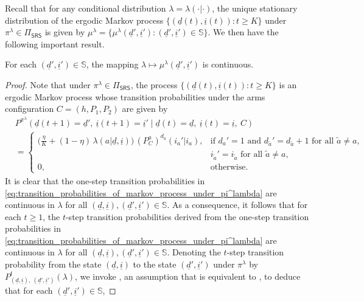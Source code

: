 Recall that for any conditional distribution $\lambda=\lambda(\cdot|\cdot)$, the unique stationary distribution of the ergodic Markov process $\{(\underline{d}(t), \underline{i}(t)): t\geq K\}$ under $\pi^\lambda \in \Pi_{\textsf{SRS}}$ is given by $\mu^\lambda=\{\mu^\lambda(\underline{d}', \underline{i}'): (\underline{d}', \underline{i}')\in \mathbb{S}\}$. We then have the following important result.
\begin{lemma}
	\label{lemma:continuity_of_mu_lambda_in_lambda}
	For each $(\underline{d}', \underline{i}')\in \mathbb{S}$, the mapping $\lambda \mapsto \mu^\lambda(\underline{d}', \underline{i}')$ is continuous.
\end{lemma}
\begin{proof}
Note that under $\pi^\lambda\in \Pi_{\textsf{SRS}}$, the process $\{(\underline{d}(t),\underline{i}(t)): t\geq K\}$ is an ergodic Markov process whose transition probabilities under the arms configuration $C=(h, P_1, P_2)$ are given by	
\begin{align}
	&P^{\pi^\lambda}(\underline{d}(t+1)=\underline{d}',~\underline{i}(t+1)=\underline{i}'\mid \underline{d}(t)=\underline{d},~\underline{i}(t)=\underline{i},~C)\nonumber\\
	&=\begin{cases}
		\bigg(\frac{\eta}{K}+(1-\eta)\,\lambda(a|\underline{d},\underline{i})\bigg)\,(P_C^a)^{d_a}(i_a'|i_a),&\text{if }d_a'=1\text{ and }d_{\tilde{a}}'=d_{\tilde{a}}+1\text{ for all }\tilde{a}\neq a,\\
		&i_{\tilde{a}}'=i_{\tilde{a}}\text{ for all }\tilde{a}\neq a,\\
		0,&\text{otherwise}.
	\end{cases}
	\label{eq:transition_probabilities_of_markov_process_under_pi^lambda}
\end{align}
It is clear that the one-step transition probabilities in \eqref{eq:transition_probabilities_of_markov_process_under_pi^lambda} are continuous in $\lambda$ for all $(\underline{d}, \underline{i}), (\underline{d}', \underline{i}')\in\mathbb{S}$. As a consequence, it follows that for each $t\geq 1$, the $t$-step transition probabilities derived from the one-step transition probabilities in \eqref{eq:transition_probabilities_of_markov_process_under_pi^lambda} are continuous in $\lambda$ for all $(\underline{d}, \underline{i}), (\underline{d}', \underline{i}')\in\mathbb{S}$. Denoting the $t$-step transition probability from the state $(\underline{d}, \underline{i})$ to the state $(\underline{d}', \underline{i}')$ under $\pi^\lambda$ by $P^t_{(\underline{d}, \underline{i}), ~ (\underline{d}', \underline{i}')}(\lambda)$, we invoke \cite[Assumption A5$^\prime$]{borkar1982identification}, an assumption that is equivalent to \cite[Assumption A5]{borkar1982identification}, to deduce that for each $(\underline{d}', \underline{i}')\in \mathbb{S}$,

\end{proof}
